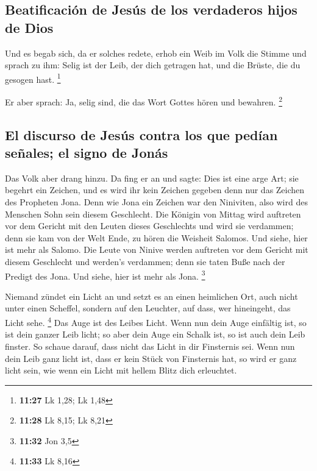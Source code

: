 \hypertarget{beatificaciuxf3n-de-jesuxfas-de-los-verdaderos-hijos-de-dios}{%
\subsection{Beatificación de Jesús de los verdaderos hijos de
Dios}\label{beatificaciuxf3n-de-jesuxfas-de-los-verdaderos-hijos-de-dios}}

 Und es begab sich, da er solches redete, erhob ein Weib
im Volk die Stimme und sprach zu ihm: Selig ist der Leib, der dich
getragen hat, und die Brüste, die du gesogen hast. \footnote{\textbf{11:27}
  Lk 1,28; Lk 1,48}

 Er aber sprach: Ja, selig sind, die das Wort Gottes
hören und bewahren. \footnote{\textbf{11:28} Lk 8,15; Lk 8,21}

\hypertarget{el-discurso-de-jesuxfas-contra-los-que-peduxedan-seuxf1ales-el-signo-de-jonuxe1s}{%
\subsection{El discurso de Jesús contra los que pedían señales; el signo
de
Jonás}\label{el-discurso-de-jesuxfas-contra-los-que-peduxedan-seuxf1ales-el-signo-de-jonuxe1s}}

 Das Volk aber drang hinzu. Da fing er an und sagte: Dies
ist eine arge Art; sie begehrt ein Zeichen, und es wird ihr kein Zeichen
gegeben denn nur das Zeichen des Propheten Jona.  Denn
wie Jona ein Zeichen war den Niniviten, also wird des Menschen Sohn sein
diesem Geschlecht.  Die Königin von Mittag wird auftreten
vor dem Gericht mit den Leuten dieses Geschlechts und wird sie
verdammen; denn sie kam von der Welt Ende, zu hören die Weisheit
Salomos. Und siehe, hier ist mehr als Salomo.  Die Leute
von Ninive werden auftreten vor dem Gericht mit diesem Geschlecht und
werden's verdammen; denn sie taten Buße nach der Predigt des Jona. Und
siehe, hier ist mehr als Jona. \footnote{\textbf{11:32} Jon 3,5}

 Niemand zündet ein Licht an und setzt es an einen
heimlichen Ort, auch nicht unter einen Scheffel, sondern auf den
Leuchter, auf dass, wer hineingeht, das Licht sehe. \footnote{\textbf{11:33}
  Lk 8,16}  Das Auge ist des Leibes Licht. Wenn nun dein
Auge einfältig ist, so ist dein ganzer Leib licht; so aber dein Auge ein
Schalk ist, so ist auch dein Leib finster.  So schaue
darauf, dass nicht das Licht in dir Finsternis sei.  Wenn
nun dein Leib ganz licht ist, dass er kein Stück von Finsternis hat, so
wird er ganz licht sein, wie wenn ein Licht mit hellem Blitz dich
erleuchtet.

